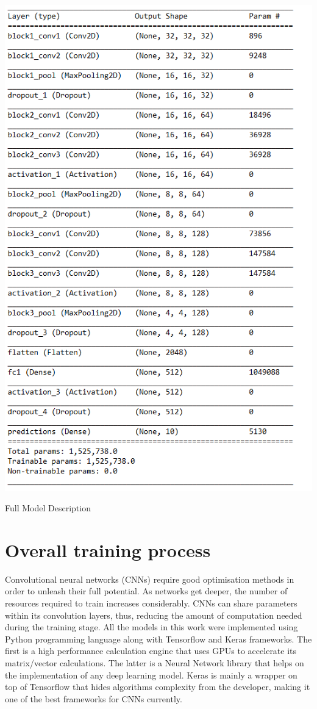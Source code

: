 \begin{table}[!h]
	\centering
	\includegraphics[scale=0.9]{vgg_arch.png}
	\caption{Full Model Description}
	\label{tbl:vgg10}
\end{table}

\section{Overall training process}

Convolutional neural networks (CNNs) require good optimisation methods in order to unleash their full potential. As networks get deeper, the number of resources required to train increases considerably. CNNs can share parameters within its convolution layers, thus, reducing the amount of computation needed during the training stage. All the models in this work were implemented using Python programming language along with Tensorflow and Keras frameworks. The first is a high performance calculation engine that uses GPUs to accelerate its matrix/vector calculations. The latter is a Neural Network library that helps on the implementation of any deep learning model. Keras is mainly a wrapper on top of Tensorflow that hides algorithms complexity from the developer, making it one of the best frameworks for CNNs currently.

